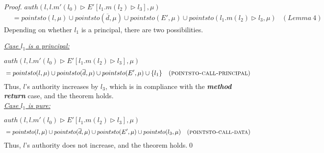 \documentclass{llncs}
\begin{document}
\begin{proof}
\noindent$auth(l, l.m'(l_0) \rhd E'[l_1.m(l_2) \rhd l_3], \mu)$
\vspace{-7pt}
\begin{align*}
&= pointsto(l, \mu) \cup pointsto(\overline{d}, \mu) \cup pointsto(E', \mu) \cup pointsto(l_1.m(l_2) \rhd l_3, \mu) & (Lemma~4)
\end{align*}
Depending on whether $l_1$ is a principal, there are two possibilities.

\noindent\textit{\underline{Case $l_1$ is a principal:}}

\noindent$auth(l, l.m'(l_0) \rhd E'[l_1.m(l_2) \rhd l_3], \mu)$
\vspace{-7pt}
\begin{align*}
&= pointsto(l, \mu) \cup pointsto(\overline{d}, \mu) \cup pointsto(E', \mu) \cup \{ l_1 \} & (\textsc{pointsto-call-principal})
\end{align*}
Thus, $l$'s authority increases by $l_3$, which is in compliance with the \textit{\textbf{method return}} case, and the theorem holds.\\

\noindent\textit{\underline{Case $l_1$ is pure:}}

\noindent$auth(l, l.m'(l_0) \rhd E'[l_1.m(l_2) \rhd l_3], \mu)$
\vspace{-7pt}
\begin{align*}
&= pointsto(l, \mu) \cup pointsto(\overline{d}, \mu) \cup pointsto(E', \mu) \cup pointsto(l_3, \mu) & (\textsc{pointsto-call-data})
\end{align*}
Thus, $l$'s authority does not increase, and the theorem holds.\qed

\end{proof}


\newpage
\end{document}
